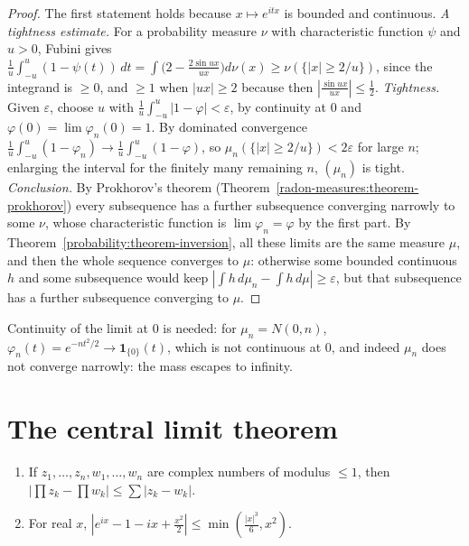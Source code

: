 \begin{proof}
The first statement holds because $x \mapsto e^{itx}$ is bounded and continuous. \emph{A tightness estimate.} For a probability measure $\nu$ with characteristic function $\psi$ and $u > 0$, Fubini gives
$\frac1u\int_{-u}^u(1 - \psi(t))\,dt = \int\bigl(2 - \frac{2\sin ux}{ux}\bigr)d\nu(x) \geq \nu(\{|x| \geq 2/u\})$, since the integrand is $\geq 0$, and $\geq 1$ when $|ux| \geq 2$ because then $|\frac{\sin ux}{ux}| \leq \frac12$.
\emph{Tightness.} Given $\varepsilon$, choose $u$ with $\frac1u\int_{-u}^u|1 - \varphi| < \varepsilon$, by continuity at $0$ and $\varphi(0) = \lim\varphi_n(0) = 1$. By dominated convergence $\frac1u\int_{-u}^u(1 - \varphi_n) \to \frac1u\int_{-u}^u(1 - \varphi)$, so
$\mu_n(\{|x| \geq 2/u\}) < 2\varepsilon$ for large $n$; enlarging the interval for the finitely many remaining $n$, $(\mu_n)$ is tight.
\emph{Conclusion.} By Prokhorov's theorem (Theorem~\ref{radon-measures:theorem-prokhorov}) every subsequence has a further subsequence converging narrowly to some $\nu$, whose characteristic function is
$\lim\varphi_n = \varphi$ by the first part. By Theorem~\ref{probability:theorem-inversion}, all these limits are the same measure $\mu$, and then the whole sequence converges to $\mu$: otherwise some bounded continuous $h$ and
some subsequence would keep $|\int h\,d\mu_n - \int h\,d\mu| \geq \varepsilon$, but that subsequence has a further subsequence converging to $\mu$.
\end{proof}

\begin{counterexample}\label{probability:counterexample-continuity-at-zero}
Continuity of the limit at $0$ is needed: for $\mu_n = N(0, n)$, $\varphi_n(t) = e^{-nt^2/2} \to \mathbf{1}_{\{0\}}(t)$, which is not continuous at $0$, and indeed $\mu_n$ does not converge narrowly: the mass escapes to infinity.
\end{counterexample}

\section{The central limit theorem}\label{probability:section-clt}

\begin{lemma}\label{probability:lemma-products}
\begin{enumerate}
\item If $z_1, \ldots, z_n, w_1, \ldots, w_n$ are complex numbers of modulus $\leq 1$, then $|\prod z_k - \prod w_k| \leq \sum|z_k - w_k|$.
\item For real $x$, $|e^{ix} - 1 - ix + \frac{x^2}{2}| \leq \min(\frac{|x|^3}{6}, x^2)$.
\end{enumerate}
\end{lemma}

